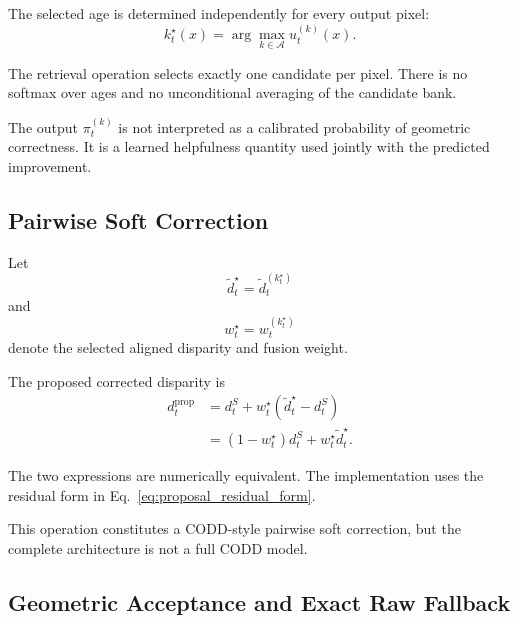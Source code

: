 \documentclass[11pt,a4paper]{article}
\begin{document}
The selected age is determined independently for every output pixel:
%
\begin{equation}
k_t^\star(x)
=
\arg\max_{k\in\mathcal{A}}
u_t^{(k)}(x).
\label{eq:pixelwise_retrieval}
\end{equation}

The retrieval operation selects exactly one candidate per pixel.
There is no softmax over ages and no unconditional averaging of the
candidate bank.

The output \(\pi_t^{(k)}\) is not interpreted as a calibrated probability
of geometric correctness. It is a learned helpfulness quantity used
jointly with the predicted improvement.

\subsection{Pairwise Soft Correction}
\label{sec:soft_correction}

Let
%
\begin{equation}
\widetilde d_t^\star
=
\widetilde d_t^{(k_t^\star)}
\end{equation}
%
and
%
\begin{equation}
w_t^\star
=
w_t^{(k_t^\star)}
\end{equation}
%
denote the selected aligned disparity and fusion weight.

The proposed corrected disparity is
%
\begin{align}
d_t^{\mathrm{prop}}
&=
d_t^S
+
w_t^\star
\left(
\widetilde d_t^\star-d_t^S
\right)
\label{eq:proposal_residual_form}
\\
&=
\left(
1-w_t^\star
\right)d_t^S
+
w_t^\star
\widetilde d_t^\star.
\label{eq:proposal_convex_form}
\end{align}

The two expressions are numerically equivalent. The implementation uses
the residual form in Eq.~\eqref{eq:proposal_residual_form}.

This operation constitutes a CODD-style pairwise soft correction, but
the complete architecture is not a full CODD model.

\subsection{Geometric Acceptance and Exact Raw Fallback}
\label{sec:acceptance}
\end{document}
